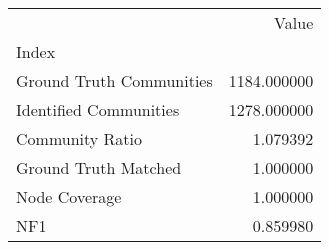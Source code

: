 \begin{tabular}{lr}
\toprule
{} &        Value \\
Index                    &              \\
\midrule
Ground Truth Communities &  1184.000000 \\
Identified Communities   &  1278.000000 \\
Community Ratio          &     1.079392 \\
Ground Truth Matched     &     1.000000 \\
Node Coverage            &     1.000000 \\
NF1                      &     0.859980 \\
\bottomrule
\end{tabular}
